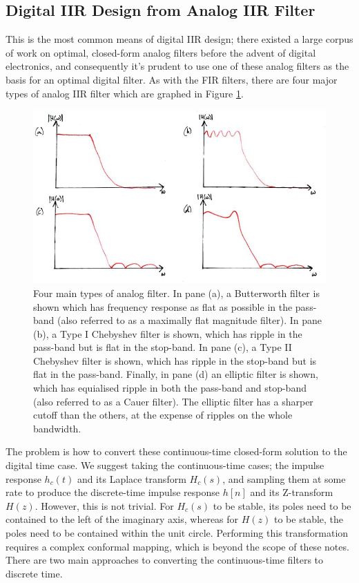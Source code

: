\subsection{Digital IIR Design from Analog IIR Filter}
%
This is the most common means of digital IIR design; there existed a large
corpus of work on optimal, closed-form analog filters before the advent of digital
electronics, and consequently it's prudent to use one of these analog
filters as the basis for an optimal digital filter. As with the
FIR filters, there are four major types of analog IIR filter which are
graphed in Figure \ref{fig::lecture_18_analog_filters}.\\
%
\begin{figure}[!htb]
  \includegraphics[width=\textwidth]{images/lecture_18_analog_filters.JPG}
  \caption{Four main types of analog filter. In pane (a), a Butterworth
    filter is shown which has frequency response as flat as possible in the
    pass-band (also referred to as a maximally flat magnitude filter). In
    pane (b), a Type I Chebyshev filter is shown, which has ripple in the
    pass-band but is flat in the stop-band. In pane (c), a Type II Chebyshev
    filter is shown, which has ripple in the stop-band but is flat in the
    pass-band. Finally, in pane (d) an elliptic filter is shown, which
    has equialised ripple in both the pass-band and stop-band (also
    referred to as a Cauer filter). The elliptic filter has a sharper cutoff
    than the others, at the expense of ripples on the whole bandwidth.
  }
  \label{fig::lecture_18_analog_filters}
\end{figure}
%
The problem is how to convert these continuous-time closed-form solution to
the digital time case. We suggest taking the continuous-time cases;
the impulse response $h_c(t)$ and its Laplace transform $H_c(s)$, and
sampling them at some rate to produce the discrete-time impulse response
$h[n]$ and its Z-transform $H(z)$. However, this is not trivial. For
$H_c(s)$ to be stable, its poles need to be contained to the left of the
imaginary axis, whereas for $H(z)$ to be stable, the poles need to be
contained within the unit circle. Performing this transformation requires
a complex conformal mapping, which is beyond the scope of these notes.\\
%
There are two main approaches to converting the continuous-time filters
to discrete time.


